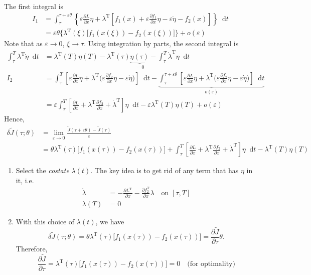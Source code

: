 \documentclass[letterpaper,12pt,titlepage]{report}
\newcommand*\dif{\mathop{}\!\mathrm{d}}
\newcommand{\trans}{^\text{T}}
\newcommand*\pder[2]{\frac{\partial #1}{\partial #2}}
\theoremstyle{plain}
\theoremstyle{definition}
\begin{document}
\noindent
The first integral is
\begin{align}
  I_1 &= \int_\tau^{\tau+\varepsilon\theta} \left\{ \varepsilon\pder{L}{x}\eta + \lambda\trans \left[f_1(x)+\varepsilon\pder{f_1}{x}\eta-\varepsilon\dot\eta-f_2(x)\right] \right\} \dif t \\
      &= \varepsilon\theta \Big\{ \lambda\trans(\xi) \big[ f_1(x(\xi)) - f_2(x(\xi)) \big] \Big\} + o(\varepsilon)
\end{align}
Note that as $\varepsilon\to0$, $\xi\to\tau$. Using integration by parts, the second integral is
\begin{align}
  \int_\tau^T \lambda\trans \dot\eta \dif t &= \lambda\trans(T) \eta(T) - \lambda\trans(\tau) \underbrace{\eta(\tau)}_{=0} - \int_\tau^T \dot\lambda\trans \eta \dif t \\
  I_2 &= \int_\tau^T \left[ \varepsilon\pder{L}{x}\eta + \lambda\trans \Big( \varepsilon\pder{f_2}{x}\eta - \varepsilon\dot\eta \Big) \right] \dif t - \underbrace{ \int_\tau^{\tau+\varepsilon\theta} \left[ \varepsilon\pder{L}{x}\eta + \lambda\trans \Big( \varepsilon\pder{f_2}{x}\eta - \varepsilon\dot\eta \Big) \right] \dif t }_{o(\varepsilon)} \\
                                            &= \varepsilon \int_\tau^T \left[ \pder{L}{x} + \lambda\trans \pder{f_2}{x} + \dot\lambda\trans \right] \eta \dif t - \varepsilon \lambda\trans(T)\eta(T) + o(\varepsilon)
\end{align}
Hence,
\begin{align}
  \delta\tilde J(\tau;\theta) &= \lim_{\varepsilon\to0} \frac{\tilde J(\tau+\varepsilon\theta) - \tilde J(\tau)}{\varepsilon} \\
                              &= \theta\lambda\trans(\tau) \Big[ f_1(x(\tau)) - f_2(x(\tau)) \Big] + \int_\tau^T \left[ \pder{L}{x} + \lambda\trans \pder{f_2}{x} + \dot\lambda\trans \right] \eta \dif t - \lambda\trans(T)\eta(T)
\end{align}

\begin{enumerate}[resume*]
\item Select the \emph{costate} $\lambda(t)$. The key idea is to get rid of any term that has $\eta$ in it, i.e.
  \begin{align}
    \dot\lambda &= -\pder{L\trans}{x} - \pder{f_2\trans}{x} \lambda \quad \text{on } [\tau,T] \\
    \lambda(T) &= 0
  \end{align}
\item With this choice of $\lambda(t)$, we have
  \[ \delta\tilde J(\tau;\theta) = \theta\lambda\trans(\tau) \Big[ f_1(x(\tau)) - f_2(x(\tau)) \Big] = \pder{\tilde J}{\tau} \theta. \]
  Therefore,
  \[ \pder{\tilde J}{\tau} = \lambda\trans(\tau) \Big[ f_1(x(\tau)) - f_2(x(\tau)) \Big] = 0 \quad \text{(for optimality)} \]
\end{enumerate}
\end{document}
